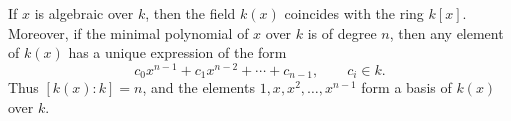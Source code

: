If $x$ is algebraic over $k$, then the field $k(x)$ coincides with the ring $k[x]$. Moreover, if the minimal polynomial of $x$ over $k$ is of degree $n$, then any element of $k(x)$ has a unique expression of the form
$$c_0 x^{n-1} + c_1 x^{n-2} + \cdots + c_{n-1}, \qquad c_i \in k.$$
Thus $[k(x) : k] = n$, and the elements $1, x, x^2, \ldots, x^{n-1}$ form a basis of $k(x)$ over $k$.
